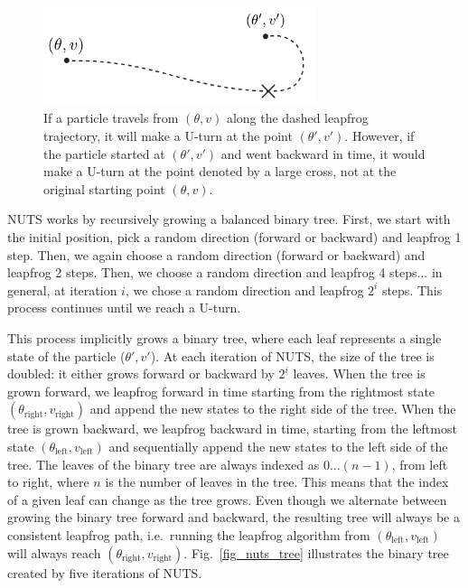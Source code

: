 \documentclass[12pt]{article}
\begin{document}
\begin{figure}[H]
\centering
\includegraphics[width=8cm]{illustrations/nuts_uturn_detailed_balance.pdf}
\caption{If a particle travels from $(\theta, v)$ along the dashed leapfrog trajectory, it will make a U-turn at the point $(\theta', v')$. However, if the particle started at $(\theta', v')$ and went backward in time, it would make a U-turn at the point denoted by a large cross, not at the original starting point $(\theta, v)$.}
\label{fig_nuts_uturn_detailed_balance}
\end{figure}

NUTS works by recursively growing a balanced binary tree. First, we start with the initial position, pick a random direction (forward or backward) and leapfrog 1 step. Then, we again choose a random direction (forward or backward) and leapfrog 2 steps. Then, we choose a random direction and leapfrog 4 steps... in general, at iteration $i$, we chose a random direction and leapfrog $2^i$ steps. This process continues until we reach a U-turn.

This process implicitly grows a binary tree, where each leaf represents a single state of the particle ($\theta', v'$). At each iteration of NUTS, the size of the tree is doubled: it either grows forward or backward by $2^i$ leaves. When the tree is grown forward, we leapfrog forward in time starting from the rightmost state $(\theta_\text{right}, v_\text{right})$ and append the new states to the right side of the tree. When the tree is grown backward, we leapfrog backward in time, starting from the leftmost state $(\theta_\text{left}, v_\text{left})$ and sequentially append the new states to the left side of the tree. The leaves of the binary tree are always indexed as $0 \ldots (n-1)$, from left to right, where $n$ is the number of leaves in the tree. This means that the index of a given leaf can change as the tree grows. Even though we alternate between growing the binary tree forward and backward, the resulting tree will always be a consistent leapfrog path, i.e.\ running the leapfrog algorithm from $(\theta_\text{left}, v_\text{left})$ will always reach $(\theta_\text{right}, v_\text{right})$. Fig.\ \ref{fig_nuts_tree} illustrates the binary tree created by five iterations of NUTS.
\end{document}
